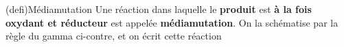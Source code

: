 \documentclass[../../main/main.tex]{subfiles}
\begin{document}
\begin{tcb*}[sidebyside, righthand ratio=.3](defi){Médiamutation}
  Une réaction dans laquelle le \textbf{produit} est \textbf{à la fois oxydant
  et réducteur} est appelée \textbf{médiamutation}. On la schématise par la
  règle du gamma ci-contre, et on écrit cette réaction
  \psw{
      \[
      \ce{A + B = 2C}
    \]
  }
  \tcblower
  \begin{center}
  \end{center}
\end{tcb*}
\end{document}
